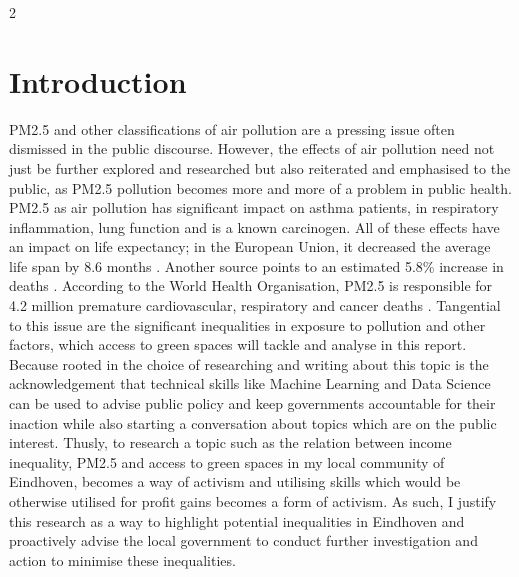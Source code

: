 \documentclass[12pt, a4paper]{article}
\begin{document}
\begin{multicols}{2}
    \section{Introduction}
    PM2.5 and other classifications of air pollution are a pressing issue often dismissed in the public discourse. However, the effects of air pollution need not just be further explored and researched but also reiterated and emphasised to the public, as PM2.5 pollution becomes more and more of a problem in public health.
    PM2.5 as air pollution has significant impact on asthma patients, in respiratory inflammation, lung function and is a known carcinogen. All of these effects have an impact on life expectancy; in the European Union, it decreased the average life span by 8.6 months \cite{xing2016impact}. Another source points to an estimated 5.8\% increase in deaths \cite{Schwartz01101996}. According to the World Health Organisation, PM2.5 is responsible for 4.2 million premature cardiovascular, respiratory and cancer deaths \cite{THURSTON2022107066}.
    Tangential to this issue are the significant inequalities in exposure to pollution and other factors, which access to green spaces will tackle and analyse in this report.  Because rooted in the choice of researching and writing about this topic is the acknowledgement that technical skills like Machine Learning and Data Science can be used to advise public policy and keep governments accountable for their inaction while also starting a conversation about topics which are on the public interest. Thusly, to research a topic such as the relation between income inequality, PM2.5 and access to green spaces in my local community of Eindhoven, becomes a way of activism and utilising skills which would be otherwise utilised for profit gains becomes a form of activism.
    As such, I justify this research as a way to highlight potential inequalities in Eindhoven and proactively advise the local government to conduct further investigation and action to minimise these inequalities.

\end{multicols}
\end{document}

